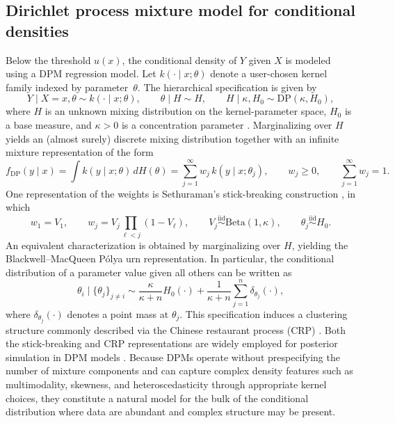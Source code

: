 \documentclass[article]{jss}\usepackage[]{graphicx}\usepackage[]{xcolor}
\begin{document}
\subsection{Dirichlet process mixture model for conditional densities}
\label{subsec:dpm}

Below the threshold $u(x)$, the conditional density of $Y$ given $X$
is modeled using a DPM regression model.  Let
$k(\cdot\mid x;\theta)$ denote a user-chosen kernel family indexed by
parameter~$\theta$.  The hierarchical specification is given by
\begin{equation*}
Y \mid X=x,\theta \sim k(\cdot\mid x;\theta),
\qquad
\theta \mid H \sim H,
\qquad
H \mid \kappa,H_0 \sim \mathrm{DP}(\kappa,H_0),
\end{equation*}
where $H$ is an unknown mixing distribution on the kernel-parameter
space, $H_0$ is a base measure, and $\kappa>0$ is a concentration
parameter \citep{Ferguson1973}.  Marginalizing over $H$ yields an
(almost surely) discrete mixing distribution together with an infinite
mixture representation of the form
\begin{equation*}
f_{\mathrm{DP}}(y\mid x)
=
\int k(y\mid x;\theta)\,dH(\theta)
=
\sum_{j=1}^{\infty} w_j\,k(y\mid x;\theta_j),
\qquad
w_j\ge 0,
\qquad
\sum_{j=1}^{\infty} w_j=1.
\end{equation*}
One representation of the weights is Sethuraman's stick-breaking
construction \citep{Sethuraman1994}, in which
\begin{equation}
w_1=V_1,
\qquad
w_j=V_j\prod_{\ell<j}(1-V_\ell),
\qquad
V_j \stackrel{\mathrm{iid}}{\sim}\mathrm{Beta}(1,\kappa),
\qquad
\theta_j \stackrel{\mathrm{iid}}{\sim} H_0.
\label{eq:sb}
\end{equation}
An equivalent characterization is obtained by marginalizing over $H$,
yielding the Blackwell--MacQueen P\'olya urn representation.  In
particular, the conditional distribution of a parameter value given all
others can be written as
\begin{equation*}
\theta_i \mid \{\theta_j\}_{j \neq i}
\sim
\frac{\kappa}{\kappa+n} H_0(\cdot)
+
\frac{1}{\kappa+n}\sum_{j=1}^{n}\delta_{\theta_j}(\cdot),
\end{equation*}
where $\delta_{\theta_j}(\cdot)$ denotes a point mass at $\theta_j$.
This specification induces a clustering structure commonly described
via the Chinese restaurant process (CRP) \citep{Neal2000}.  Both the
stick-breaking and CRP representations are widely employed for
posterior simulation in DPM models
\citep{EscobarWest1995,Neal2000}.  Because DPMs operate without
prespecifying the number of mixture components and can capture complex
density features such as multimodality, skewness, and
heteroscedasticity through appropriate kernel choices, they constitute
a natural model for the bulk of the conditional distribution where data
are abundant and complex structure may be present.
\end{document}

